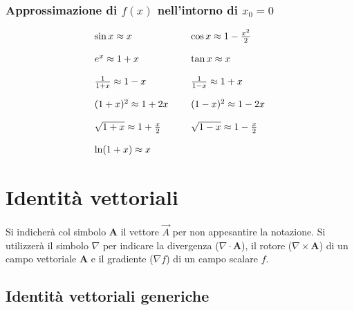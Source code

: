 \documentclass[10pt,a4paper]{book}
\begin{document}
\subsection*{Approssimazione di $\displaystyle f( x)$ nell'intorno di $\displaystyle x_0 =0$}


\begin{equation*}
	\begin{array}{ l l }
		\sin x\approx x & \cos x\approx 1-\frac{x^2}{2}\\
		[4mm]
		e^x \approx 1+x & \tan x\approx x\\
		[4mm]
		\frac{1}{1+x} \approx 1-x & \frac{1}{1-x} \approx 1+x\\
		[4mm]
		( 1+x)^2 \approx 1+2x\ \ \ \  & ( 1-x)^2 \approx 1-2x\\
		[4mm]
		\sqrt{1+x} \approx 1+\frac{x}{2} & \sqrt{1-x} \approx 1-\frac{x}{2}\\
		[4mm]
		\ln( 1+x) \approx x &
	\end{array}
\end{equation*}















\chapter{Identità vettoriali}

Si indicherà col simbolo $\mathbf{A}$ il vettore $\vec{A}$ per non appesantire la notazione. Si utilizzerà il simbolo $\nabla$ per indicare la divergenza ($\nabla\cdot\mathbf{A}$), il rotore ($\nabla\times\mathbf{A}$) di un campo vettoriale $\mathbf{A}$ e il gradiente ($\nabla f$) di un campo scalare $f$.

\section{Identità vettoriali generiche}
\end{document}
